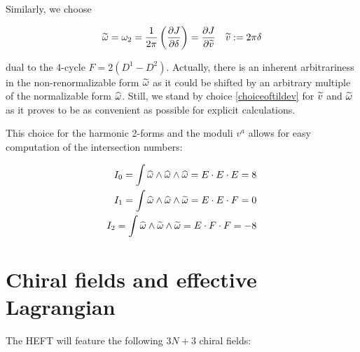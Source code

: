 Similarly, we choose

\begin{align}
	\widetilde{\omega} = \omega_2 = \frac{1}{2\pi} \left( \frac{\partial J}{\partial\delta} \right) = \frac{\partial J}{\partial\widetilde{v}} && \widetilde{v} := 2\pi\delta
	\label{choiceoftildev}
\end{align}

dual to the 4-cycle $F = 2 (D^1 - D^2)$. Actually, there is an inherent arbitrariness in the non-renormalizable form $\widetilde{\omega}$ as it could be shifted by an arbitrary multiple of the normalizable form $\widehat{\omega}$. Still, we stand by choice \eqref{choiceoftildev} for $\widetilde{v}$ and $\widetilde{\omega}$ as it proves to be as convenient as possible for explicit calculations.


This choice for the harmonic 2-forms and the moduli $v^a$ allows for easy computation of the intersection numbers:

\begin{align}
	I_0 = \int \widehat{\omega} \wedge \widehat{\omega} \wedge \widehat{\omega} = E \cdot E \cdot E  = 8 \\
	I_1 = \int \widehat{\omega} \wedge \widehat{\omega} \wedge \widetilde{\omega} = E \cdot E \cdot F  = 0\\
	I_2 = \int \widehat{\omega} \wedge \widetilde{\omega} \wedge \widetilde{\omega} = E \cdot F \cdot F = -8
	\label{}
\end{align}

%

\section{Chiral fields and effective Lagrangian}

The HEFT will feature the following $3N + 3$ chiral fields:

